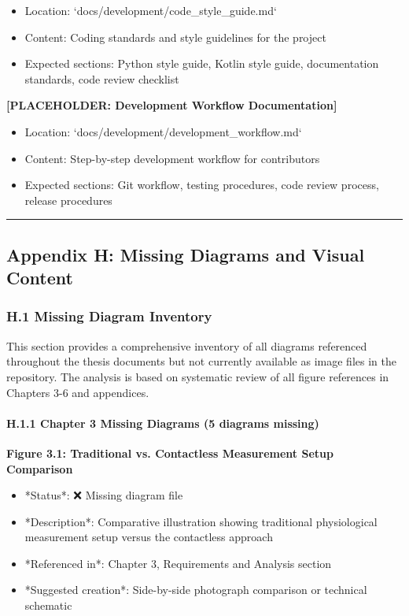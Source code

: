 \documentclass[11pt,a4paper]{article}
\begin{document}
{{\begin{itemize}
\item Location: `docs/development/code_style_guide.md`
\item Content: Coding standards and style guidelines for the project
\item Expected sections: Python style guide, Kotlin style guide, documentation standards, code review checklist

\end{itemize}
\textbf{[PLACEHOLDER: Development Workflow Documentation]}

\begin{itemize}
\item Location: `docs/development/development_workflow.md`
\item Content: Step-by-step development workflow for contributors
\item Expected sections: Git workflow, testing procedures, code review process, release procedures

\end{itemize}
\hrule

\subsection{Appendix H: Missing Diagrams and Visual Content}

\subsubsection{H.1 Missing Diagram Inventory}

This section provides a comprehensive inventory of all diagrams referenced throughout the thesis documents but not
currently available as image files in the repository. The analysis is based on systematic review of all figure
references in Chapters 3-6 and appendices.

\paragraph{H.1.1 Chapter 3 Missing Diagrams (5 diagrams missing)}

\textbf{Figure 3.1: Traditional vs. Contactless Measurement Setup Comparison}

\begin{itemize}
\item *Status*: ❌ Missing diagram file
\item *Description*: Comparative illustration showing traditional physiological measurement setup versus the contactless
  approach
\item *Referenced in*: Chapter 3, Requirements and Analysis section
\item *Suggested creation*: Side-by-side photograph comparison or technical schematic


\end{itemize}}}
\end{document}
